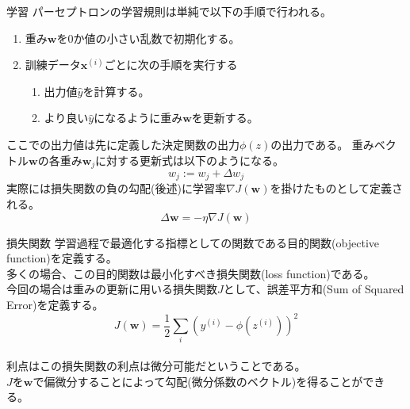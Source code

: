 \documentclass[aspectratio=169, dvipdfmx, 11pt]{beamer} %
\begin{document}
\begin{frame}{学習}
    パーセプトロンの学習規則は単純で以下の手順で行われる。
    \begin{enumerate}
        \item 重み\(\bm{w}\)を0か値の小さい乱数で初期化する。
        \item 訓練データ\(\bm{x}^{(i)}\)ごとに次の手順を実行する
        \begin{enumerate}
            \item 出力値\(\hat{y}\)を計算する。
            \item より良い\(\hat{y}\)になるように重み\(\bm{w}\)を更新する。
        \end{enumerate}
    \end{enumerate}
    \vspace{1em}
    ここでの出力値は先に定義した決定関数の出力\(\phi(z)\)の出力である。
    重みベクトル\(\bm{w}\)の各重み\(\bm{w}_j\)に対する更新式は以下のようになる。
    \begin{equation*}
        w_j := w_j + \Delta w_j
    \end{equation*}
    実際には損失関数の負の勾配(後述)に学習率\(\nabla J(\bm{w})\)を掛けたものとして定義される。
    \begin{equation*}
        \Delta \bm{w} = - \eta \nabla J(\bm{w})
    \end{equation*}
\end{frame}

\begin{frame}{損失関数}
    学習過程で最適化する指標としての関数である目的関数(objective function)を定義する。\\
    多くの場合、この目的関数は最小化すべき損失関数(loss function)である。 \\
    今回の場合は重みの更新に用いる損失関数\(J\)として、誤差平方和(Sum of Squared Error)を定義する。
    \vspace{1em}
    \begin{equation*}
        J(\bm{w}) = \frac{1}{2}\sum_{i}^{}(y^{(i)} - \phi(z^{(i)}))^2
    \end{equation*}
    \\
    \vspace{1em}
    利点はこの損失関数の利点は微分可能だということである。 \\
    \(J\)を\(\bm{w}\)で偏微分することによって勾配(微分係数のベクトル)を得ることができる。
\end{frame}
\end{document}
